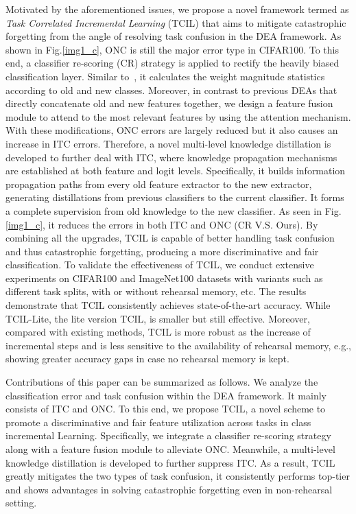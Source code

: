 \documentclass[letterpaper]{article} %
\begin{document}
Motivated by the aforementioned issues, we propose a novel framework termed as \emph{Task Correlated Incremental Learning} (TCIL) that aims to mitigate catastrophic forgetting from the angle of resolving task confusion in the DEA framework. As shown in Fig.\ref{img1_c}, ONC is still the major error type in CIFAR100. To this end, a classifier re-scoring (CR) strategy is applied to rectify the heavily biased classification layer. Similar to~\cite{d39}, it calculates the weight magnitude statistics according to old and new classes. Moreover, in contrast to previous DEAs that directly concatenate old and new features together, we design a feature fusion module to attend to the most relevant features by using the attention mechanism. With these modifications, ONC errors are largely reduced but it also causes an increase in ITC errors. Therefore, a novel multi-level knowledge distillation is developed to further deal with ITC, where knowledge propagation mechanisms are established at both feature and logit levels. Specifically, it builds information propagation paths from every old feature extractor to the new extractor, generating distillations from previous classifiers to the current classifier. It forms a complete supervision from old knowledge to the new classifier. As seen in Fig.\ref{img1_c}, it reduces the errors in both ITC and ONC (CR V.S. Ours). By combining all the upgrades, TCIL is capable of better handling task confusion and thus catastrophic forgetting, producing a more discriminative and fair classification. To validate the effectiveness of TCIL, we conduct extensive experiments on CIFAR100 and ImageNet100 datasets with variants such as different task splits, with or without rehearsal memory, etc. The results demonstrate that TCIL consistently achieves state-of-the-art accuracy. While TCIL-Lite, the lite version TCIL, is smaller but still effective. Moreover, compared with existing methods, TCIL is more robust as the increase of incremental steps and is less sensitive to the availability of rehearsal memory, e.g., showing greater accuracy gaps in case no rehearsal memory is kept.

Contributions of this paper can be summarized as follows. We analyze the classification error and task confusion within the DEA framework. It mainly consists of ITC and ONC. To this end, we propose TCIL, a novel scheme to promote a discriminative and fair feature utilization across tasks in class incremental Learning. Specifically, we integrate a classifier re-scoring strategy along with a feature fusion module to alleviate ONC. Meanwhile, a multi-level knowledge distillation is developed to further suppress ITC. As a result, TCIL greatly mitigates the two types of task confusion, it consistently performs top-tier and shows advantages in solving catastrophic forgetting even in non-rehearsal setting.
\end{document}
